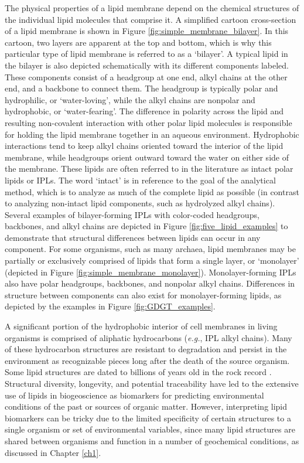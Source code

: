 The physical properties of a lipid membrane depend on the chemical structures of the individual lipid molecules that comprise it. A simplified cartoon cross-section of a lipid membrane is shown in Figure \ref{fig:simple_membrane_bilayer}. In this cartoon, two layers are apparent at the top and bottom, which is why this particular type of lipid membrane is referred to as a `bilayer'. A typical lipid in the bilayer is also depicted schematically with its different components labeled. These components consist of a headgroup at one end, alkyl chains at the other end, and a backbone to connect them. The headgroup is typically polar and hydrophilic, or `water-loving', while the alkyl chains are nonpolar and hydrophobic, or `water-fearing'. The difference in polarity across the lipid and resulting non-covalent interaction with other polar lipid molecules is responsible for holding the lipid membrane together in an aqueous environment. Hydrophobic interactions tend to keep alkyl chains oriented toward the interior of the lipid membrane, while headgroups orient outward toward the water on either side of the membrane. These lipids are often referred to in the literature as intact polar lipids or IPLs. The word `intact' is in reference to the goal of the analytical method, which is to analyze as much of the complete lipid as possible (in contrast to analyzing non-intact lipid components, such as hydrolyzed alkyl chains). Several examples of bilayer-forming IPLs with color-coded headgroups, backbones, and alkyl chains are depicted in Figure \ref{fig:five_lipid_examples} to demonstrate that structural differences between lipids can occur in any component. For some organisms, such as many archaea, lipid membranes may be partially or exclusively comprised of lipids that form a single layer, or `monolayer' (depicted in Figure \ref{fig:simple_membrane_monolayer}). Monolayer-forming IPLs also have polar headgroups, backbones, and nonpolar alkyl chains. Differences in structure between components can also exist for monolayer-forming lipids, as depicted by the examples in Figure \ref{fig:GDGT_examples}.

A significant portion of the hydrophobic interior of cell membranes in living organisms is comprised of aliphatic hydrocarbons (\textit{e.g.}, IPL alkyl chains). Many of these hydrocarbon structures are resistant to degradation and persist in the environment as recognizable pieces long after the death of the source organism. Some lipid structures are dated to billions of years old in the rock record \citep{brocks2003composition, brocks2003reconstruction}. Structural diversity, longevity, and potential traceability have led to the extensive use of lipids in biogeoscience as biomarkers for predicting environmental conditions of the past or sources of organic matter. However, interpreting lipid biomarkers can be tricky due to the limited specificity of certain structures to a single organism or set of environmental variables, since many lipid structures are shared between organisms and function in a number of geochemical conditions, as discussed in Chapter \ref{ch1}.

